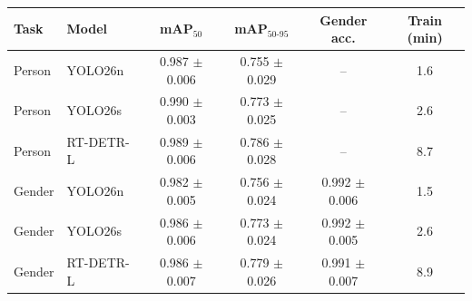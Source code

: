 \begin{tabular}{llcccc}\toprule
Task & Model & mAP$_{50}$ & mAP$_{50\text{-}95}$ & Gender acc. & Train (min) \\ \midrule
Person & YOLO26n & 0.987 $\pm$ 0.006 & 0.755 $\pm$ 0.029 & -- & 1.6 \\
Person & YOLO26s & 0.990 $\pm$ 0.003 & 0.773 $\pm$ 0.025 & -- & 2.6 \\
Person & RT-DETR-L & 0.989 $\pm$ 0.006 & 0.786 $\pm$ 0.028 & -- & 8.7 \\
Gender & YOLO26n & 0.982 $\pm$ 0.005 & 0.756 $\pm$ 0.024 & 0.992 $\pm$ 0.006 & 1.5 \\
Gender & YOLO26s & 0.986 $\pm$ 0.006 & 0.773 $\pm$ 0.024 & 0.992 $\pm$ 0.005 & 2.6 \\
Gender & RT-DETR-L & 0.986 $\pm$ 0.007 & 0.779 $\pm$ 0.026 & 0.991 $\pm$ 0.007 & 8.9 \\
\bottomrule\end{tabular}